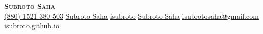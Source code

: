 \begin{center}
    \textbf{\Huge \scshape Subroto Saha} \\ \vspace{5pt}
            \href{tel:+8801521380503}{ (880) 1521-380 503}\quad
            \href{https://www.linkedin.com/in/isubrotosaha/}{ Subroto Saha}\quad
            \href{https://github.com/isubroto}{\underline{ isubroto}}\quad
            \href{https://gitlab.com/isubroto}{ Subroto Saha}\quad
            \href{mailto:isubrotosaha@gmail.com}{\underline{ isubrotosaha@gmail.com}}\quad
            \href{https://isubroto.github.io}{ isubroto.github.io}\quad
    \end{center}